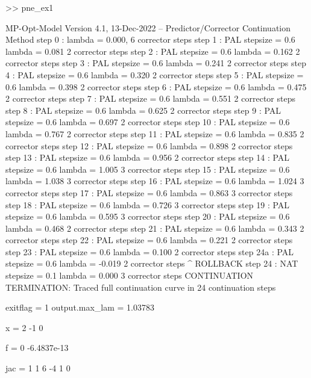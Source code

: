 \documentclass[12pt]{article}
\numberwithin{equation}{section}
\numberwithin{table}{section}
\numberwithin{figure}{section}
\begin{document}
\begin{Code}
>> pne_ex1

MP-Opt-Model Version 4.1, 13-Dec-2022 -- Predictor/Corrector Continuation Method
step   0  :                          lambda =  0.000,  6 corrector steps
step   1  : PAL stepsize = 0.6       lambda =  0.081   2 corrector steps
step   2  : PAL stepsize = 0.6       lambda =  0.162   2 corrector steps
step   3  : PAL stepsize = 0.6       lambda =  0.241   2 corrector steps
step   4  : PAL stepsize = 0.6       lambda =  0.320   2 corrector steps
step   5  : PAL stepsize = 0.6       lambda =  0.398   2 corrector steps
step   6  : PAL stepsize = 0.6       lambda =  0.475   2 corrector steps
step   7  : PAL stepsize = 0.6       lambda =  0.551   2 corrector steps
step   8  : PAL stepsize = 0.6       lambda =  0.625   2 corrector steps
step   9  : PAL stepsize = 0.6       lambda =  0.697   2 corrector steps
step  10  : PAL stepsize = 0.6       lambda =  0.767   2 corrector steps
step  11  : PAL stepsize = 0.6       lambda =  0.835   2 corrector steps
step  12  : PAL stepsize = 0.6       lambda =  0.898   2 corrector steps
step  13  : PAL stepsize = 0.6       lambda =  0.956   2 corrector steps
step  14  : PAL stepsize = 0.6       lambda =  1.005   3 corrector steps
step  15  : PAL stepsize = 0.6       lambda =  1.038   3 corrector steps
step  16  : PAL stepsize = 0.6       lambda =  1.024   3 corrector steps
step  17  : PAL stepsize = 0.6       lambda =  0.863   3 corrector steps
step  18  : PAL stepsize = 0.6       lambda =  0.726   3 corrector steps
step  19  : PAL stepsize = 0.6       lambda =  0.595   3 corrector steps
step  20  : PAL stepsize = 0.6       lambda =  0.468   2 corrector steps
step  21  : PAL stepsize = 0.6       lambda =  0.343   2 corrector steps
step  22  : PAL stepsize = 0.6       lambda =  0.221   2 corrector steps
step  23  : PAL stepsize = 0.6       lambda =  0.100   2 corrector steps
step  24a : PAL stepsize = 0.6       lambda = -0.019   2 corrector steps ^ ROLLBACK
step  24  : NAT stepsize = 0.1       lambda =  0.000   3 corrector steps
CONTINUATION TERMINATION: Traced full continuation curve in 24 continuation steps

exitflag = 1
output.max_lam = 1.03783

x = 
   2
  -1
   0

f = 
            0
  -6.4837e-13

jac =
   1   1   6
  -4   1   0
\end{Code}


\clearpage
\end{document}

